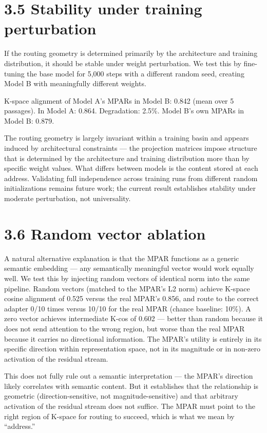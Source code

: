 \section{3.5 Stability under training perturbation}\label{stability-under-training-perturbation}

If the routing geometry is determined primarily by the architecture and training distribution, it should be stable under weight perturbation. We test this by fine-tuning the base model for 5,000 steps with a different random seed, creating Model B with meaningfully different weights.

K-space alignment of Model A's MPARs in Model B: 0.842 (mean over 5 passages). In Model A: 0.864. Degradation: 2.5\%. Model B's own MPARs in Model B: 0.879.

The routing geometry is largely invariant within a training basin and appears induced by architectural constraints --- the projection matrices impose structure that is determined by the architecture and training distribution more than by specific weight values. What differs between models is the content stored at each address. Validating full independence across training runs from different random initializations remains future work; the current result establishes stability under moderate perturbation, not universality.

\section{3.6 Random vector ablation}\label{random-vector-ablation}

A natural alternative explanation is that the MPAR functions as a generic semantic embedding --- any semantically meaningful vector would work equally well. We test this by injecting random vectors of identical norm into the same pipeline. Random vectors (matched to the MPAR's L2 norm) achieve K-space cosine alignment of 0.525 versus the real MPAR's 0.856, and route to the correct adapter 0/10 times versus 10/10 for the real MPAR (chance baseline: 10\%). A zero vector achieves intermediate K-cos of 0.602 --- better than random because it does not send attention to the wrong region, but worse than the real MPAR because it carries no directional information. The MPAR's utility is entirely in its specific direction within representation space, not in its magnitude or in non-zero activation of the residual stream.

This does not fully rule out a semantic interpretation --- the MPAR's direction likely correlates with semantic content. But it establishes that the relationship is geometric (direction-sensitive, not magnitude-sensitive) and that arbitrary activation of the residual stream does not suffice. The MPAR must point to the right region of K-space for routing to succeed, which is what we mean by ``address.''


